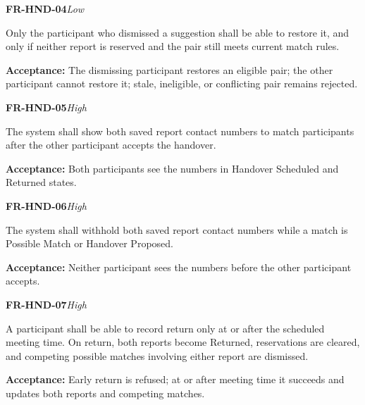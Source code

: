 \documentclass[12pt,a4paper,oneside]{report}
\begin{document}
\noindent\begin{minipage}{\linewidth}\textbf{FR-HND-04}\hfill\textit{Low}\par\nopagebreak

Only the participant who dismissed a suggestion shall be able to restore it, and only if neither report is reserved and the pair still meets current match rules.

{\color{muted}\textbf{Acceptance:} The dismissing participant restores an eligible pair; the other participant cannot restore it; stale, ineligible, or conflicting pair remains rejected.\par}\end{minipage}\par\vspace{5pt}

\noindent\begin{minipage}{\linewidth}\textbf{FR-HND-05}\hfill\textit{High}\par\nopagebreak

The system shall show both saved report contact numbers to match participants after the other participant accepts the handover.

{\color{muted}\textbf{Acceptance:} Both participants see the numbers in Handover Scheduled and Returned states.\par}\end{minipage}\par\vspace{5pt}

\noindent\begin{minipage}{\linewidth}\textbf{FR-HND-06}\hfill\textit{High}\par\nopagebreak

The system shall withhold both saved report contact numbers while a match is Possible Match or Handover Proposed.

{\color{muted}\textbf{Acceptance:} Neither participant sees the numbers before the other participant accepts.\par}\end{minipage}\par\vspace{5pt}

\noindent\begin{minipage}{\linewidth}\textbf{FR-HND-07}\hfill\textit{High}\par\nopagebreak

A participant shall be able to record return only at or after the scheduled meeting time. On return, both reports become Returned, reservations are cleared, and competing possible matches involving either report are dismissed.

{\color{muted}\textbf{Acceptance:} Early return is refused; at or after meeting time it succeeds and updates both reports and competing matches.\par}\end{minipage}\par\vspace{5pt}
\end{document}
